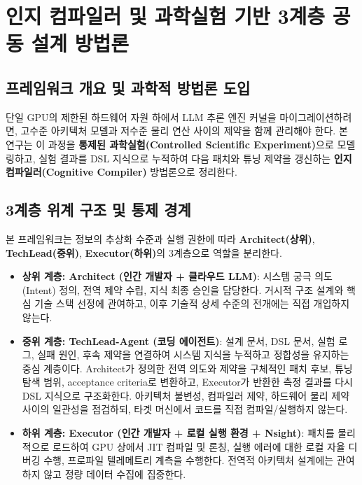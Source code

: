 \documentclass{kcc} %
\begin{document}
\section{인지 컴파일러 및 과학실험 기반 3계층 공동 설계 방법론}

\subsection{프레임워크 개요 및 과학적 방법론 도입}

단일 GPU의 제한된 하드웨어 자원 하에서 LLM 추론 엔진 커널을 마이그레이션하려면, 고수준 아키텍처 모델과 저수준 물리 연산 사이의 제약을 함께 관리해야 한다. 본 연구는 이 과정을 \textbf{통제된 과학실험(Controlled Scientific Experiment)}으로 모델링하고, 실험 결과를 DSL 지식으로 누적하여 다음 패치와 튜닝 제약을 갱신하는 \textbf{인지 컴파일러(Cognitive Compiler)} 방법론으로 정리한다.


\subsection{3계층 위계 구조 및 통제 경계}

본 프레임워크는 정보의 추상화 수준과 실행 권한에 따라 \textbf{Architect(상위)}, \textbf{TechLead(중위)}, \textbf{Executor(하위)}의 3계층으로 역할을 분리한다.


\begin{itemize}
\item \textbf{상위 계층: Architect (인간 개발자 + 클라우드 LLM)}: 시스템 궁극 의도(Intent) 정의, 전역 제약 수립, 지식 최종 승인을 담당한다. 거시적 구조 설계와 핵심 기술 스택 선정에 관여하고, 이후 기술적 상세 수준의 전개에는 직접 개입하지 않는다.
\item \textbf{중위 계층: TechLead-Agent (코딩 에이전트)}: 설계 문서, DSL 문서, 실험 로그, 실패 원인, 후속 제약을 연결하여 시스템 지식을 누적하고 정합성을 유지하는 중심 계층이다. Architect가 정의한 전역 의도와 제약을 구체적인 패치 후보, 튜닝 탐색 범위, acceptance criteria로 변환하고, Executor가 반환한 측정 결과를 다시 DSL 지식으로 구조화한다. 아키텍처 불변성, 컴파일러 제약, 하드웨어 물리 제약 사이의 일관성을 점검하되, 타겟 머신에서 코드를 직접 컴파일/실행하지 않는다.
\item \textbf{하위 계층: Executor (인간 개발자 + 로컬 실행 환경 + Nsight)}: 패치를 물리적으로 로드하여 GPU 상에서 JIT 컴파일 및 론칭, 실행 에러에 대한 로컬 자율 디버깅 수행, 프로파일 텔레메트리 계측을 수행한다. 전역적 아키텍처 설계에는 관여하지 않고 정량 데이터 수집에 집중한다.
\end{itemize}
\end{document}
